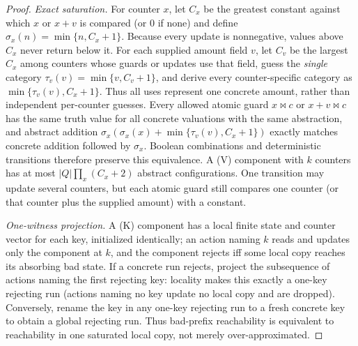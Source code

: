 \begin{proof}
\emph{Exact saturation.} For counter $x$, let $C_x$ be the greatest constant
against which $x$ or $x+v$ is compared (or $0$ if none) and define
$\sigma_x(n)=\min\{n,C_x+1\}$. Because every update is nonnegative, values above
$C_x$ never return below it. For each supplied amount field $v$, let $C_v$ be
the largest $C_x$ among counters whose guards or updates use that field, guess
the \emph{single} category $\tau_v(v)=\min\{v,C_v+1\}$, and derive every
counter-specific category as $\min\{\tau_v(v),C_x+1\}$. Thus all uses represent
one concrete amount, rather than independent per-counter guesses. Every allowed atomic guard
$x\bowtie c$ or $x+v\bowtie c$ has the same truth value for all concrete
valuations with the same abstraction, and abstract addition
$\sigma_x(\sigma_x(x)+\min\{\tau_v(v),C_x+1\})$ exactly matches concrete addition followed
by $\sigma_x$. Boolean combinations and deterministic transitions therefore
preserve this equivalence. A (V) component with $k$ counters has at most
$|Q|\prod_x(C_x+2)$ abstract configurations. One transition may update several
counters, but each atomic guard still compares one counter (or that counter
plus the supplied amount) with a constant.

\emph{One-witness projection.} A (K) component has a local finite state and
counter vector for each key, initialized identically; an action naming $k$ reads
and updates only the component at $k$, and the component rejects iff some local
copy reaches its absorbing bad state. If a concrete run rejects, project the
subsequence of actions naming the first rejecting key: locality makes this
exactly a one-key rejecting run (actions naming no key update no local copy and are dropped).
Conversely, rename the key in any one-key
rejecting run to a fresh concrete key to obtain a global rejecting run. Thus
bad-prefix reachability is equivalent to reachability in one saturated local
copy, not merely over-approximated.


\end{proof}
